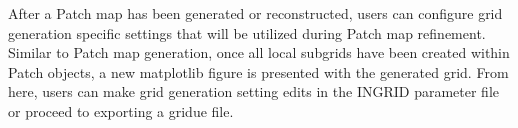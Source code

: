 After a Patch map has been generated or reconstructed, users can configure grid generation specific settings that will be utilized during Patch map refinement. Similar to Patch map generation, once all local subgrids have been created within Patch objects, a new matplotlib figure is presented with the generated grid. From here, users can make grid generation setting edits in the INGRID parameter file or proceed to exporting a gridue file.
